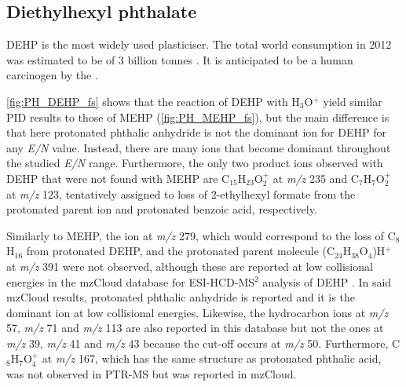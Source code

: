 

\subsection{Diethylhexyl phthalate}

DEHP is the most widely used plasticiser. The total world consumption in 2012 was estimated to be of 3 billion tonnes \cite{doi:10.1002/14356007.a20_181.pub2}.
It is anticipated to be a human carcinogen by the \citeauthor{us201614th} \cite{us201614th}.



\autoref{fig:PH_DEHP_fs} shows that the reaction of DEHP with H$_3$O$^+$ yield similar PID results to those of MEHP (\autoref{fig:PH_MEHP_fs}), but the main difference is that here protonated phthalic anhydride is not the dominant ion for DEHP for any \textit{E/N} value. 
%
Instead, there are many ions that become dominant throughout the studied \textit{E/N} range.
%
Furthermore, the only two product ions observed with DEHP that were not found with MEHP are  C$_{15}$H$_{23}$O$_2^+$ at \textit{m/z} 235 and C$_7$H$_{7}$O$_2^+$ at \textit{m/z} 123, tentatively assigned to loss of 2-ethylhexyl formate from the protonated parent ion  and protonated benzoic acid, respectively.

Similarly to MEHP, the ion at \textit{m/z} 279, which would correspond to the loss of C$_8$H$_{16}$ from protonated DEHP, and the protonated parent molecule (C$_{24}$H$_{38}$O$_{4}$)H$^+$ at \textit{m/z} 391
were not observed, although these are reported at low collisional energies in the mzCloud database for ESI-HCD-MS$^2$ analysis of DEHP \cite{mzcloudDEHP}.
%
In said mzCloud results, protonated phthalic anhydride is reported and it is the dominant ion at low collisional energies.
%
Likewise, the hydrocarbon ions at \textit{m/z} 57, \textit{m/z} 71 and \textit{m/z} 113 are also reported in this database but not the ones at \textit{m/z} 39, \textit{m/z} 41 and \textit{m/z} 43 because the cut-off occurs at \textit{m/z} 50.
%
Furthermore, C$_8$H$_7$O$_4^+$ at \textit{m/z} 167, which has the same structure as protonated phthalic acid,  was not observed in PTR-MS but was reported in mzCloud.






